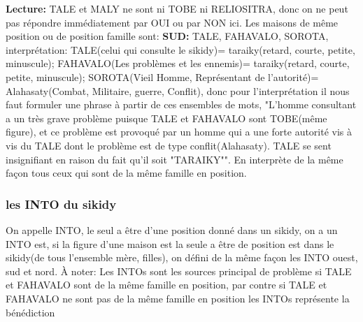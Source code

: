 \documentclass[12pt]{report}
\begin{document}
\begin{description}
\textbf{Lecture: }\newline
TALE et MALY ne sont ni TOBE ni RELIOSITRA, donc on ne peut pas répondre immédiatement par OUI ou par NON ici. \newline
Les maisons de même position ou de position famille sont: \newline
\textbf{SUD:} TALE, FAHAVALO, SOROTA, interprétation: TALE(celui qui consulte le sikidy)= taraiky(retard, courte, petite, minuscule); FAHAVALO(Les problèmes et les ennemis)= taraiky(retard, courte, petite, minuscule); SOROTA(Vieil Homme, Représentant de l'autorité)= Alahasaty(Combat, Militaire, guerre, Conflit), donc pour l’interprétation il nous faut formuler une phrase à partir de ces ensembles de mots, "L'homme consultant a un très grave problème puisque TALE et FAHAVALO sont TOBE(même figure), et ce problème est provoqué par un homme qui a une forte autorité vis à vis du TALE dont le problème est de type conflit(Alahasaty). TALE se sent insignifiant en raison du fait qu'il soit "TARAIKY"".\newline
En interprète de la même façon tous ceux qui sont de la même famille en position.

\subsubsection{les INTO du sikidy}
On appelle INTO, le seul a être d'une position donné dans un sikidy, on a un INTO est, si la figure d'une maison est la seule a être de position est dans le sikidy(de tous l'ensemble mère, filles), on défini de la même façon les INTO ouest, sud et nord.\newline
À noter: Les INTOs sont les sources principal de problème si TALE et FAHAVALO sont de la même famille en position, par contre si TALE et FAHAVALO ne sont pas de la même famille en position les INTOs représente la bénédiction         
  
\end{description}
\end{document}
